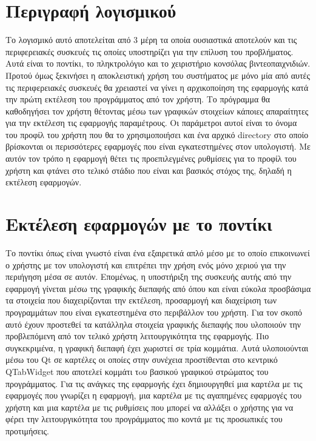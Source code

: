 





\section{Περιγραφή λογισμικού}


Το λογισμικό αυτό αποτελείται από 3 μέρη τα οποία ουσιαστικά αποτελούν και
τις περιφερειακές συσκευές τις οποίες υποστηρίζει για την επίλυση του προβλήματος.
Αυτά είναι το ποντίκι, το πληκτρολόγιο και το χειριστήριο κονσόλας βιντεοπαιχνιδιών.
Προτού όμως ξεκινήσει η αποκλειστική χρήση του συστήματος με μόνο μία από αυτές
τις περιφερειακές συσκευές θα χρειαστεί να γίνει η αρχικοποίηση της εφαρμογής κατά
την πρώτη εκτέλεση του προγράμματος από τον χρήστη. Το πρόγραμμα θα καθοδηγήσει τον
χρήστη θέτοντας μέσω των γραφικών στοιχείων κάποιες απαραίτητες για την εκτέλεση
τις εφαρμογής παραμέτρους. Οι παράμετροι αυτοί είναι το όνομα του προφίλ του χρήστη
που θα το χρησιμοποιήσει και ένα αρχικό directory στο οποίο βρίσκονται οι περισσότερες
εφαρμογές που είναι εγκατεστημένες στον υπολογιστή. Με αυτόν τον τρόπο η εφαρμογή 
θέτει τις προεπιλεγμένες ρυθμίσεις για το προφίλ του χρήστη και φτάνει στο τελικό
στάδιο που είναι και βασικός στόχος της, δηλαδή η εκτέλεση εφαρμογών.

\section{Εκτέλεση εφαρμογών με το ποντίκι}


Το ποντίκι όπως είναι γνωστό είναι ένα εξαιρετικά απλό μέσο με το οποίο επικοινωνεί
ο χρήστης με τον υπολογιστή και επιτρέπει την χρήση ενός μόνο χεριού για την περιήγηση
μέσα σε αυτόν. Επομένως, η υποστήριξη της συσκευής αυτής από την εφαρμογή γίνεται
μέσω της γραφικής διεπαφής από όπου και είναι εύκολα προσβάσιμα τα στοιχεία που
διαχειρίζονται την εκτέλεση, προσαρμογή και διαχείριση των προγραμμάτων που είναι
εγκατεστημένα στο περιβάλλον του χρήστη. Για τον σκοπό αυτό έχουν προστεθεί τα κατάλληλα
στοιχεία γραφικής διεπαφής που υλοποιούν την προβλεπόμενη από τον τελικό χρήστη 
λειτουργικότητα της εφαρμογής. Πιο συγκεκριμένα, η γραφική διεπαφή έχει χωριστεί σε τρία κομμάτια.
Αυτά υλοποιούνται μέσω του Qt σε καρτέλες οι οποίες στην συνέχεια προστίθενται στο
κεντρικό QTabWidget που αποτελεί κομμάτι τoυ βασικού γραφικού στρώματος του προγράμματος.
Για τις ανάγκες της εφαρμογής έχει δημιουργηθεί μια καρτέλα με τις εφαρμογές που γνωρίζει
η εφαρμογή, μια καρτέλα με τις αγαπημένες εφαρμογές του χρήστη και μια καρτέλα με τις
ρυθμίσεις που μπορεί να αλλάξει ο χρήστης για να φέρει την λειτουργικότητα του προγράμματος
πιο κοντά με τις προσωπικές του προτιμήσεις.

